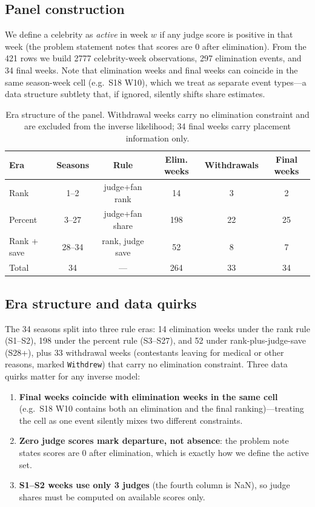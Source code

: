 \documentclass[12pt]{article}
\begin{document}
\subsection{Panel construction}
We define a celebrity as \emph{active} in week $w$ if any judge score is positive in
that week (the problem statement notes that scores are 0 after elimination). From the
421 rows we build 2777 celebrity-week observations, 297 elimination events, and 34
final weeks. Note that elimination weeks and final weeks can coincide in the same
season-week cell (e.g.\ S18 W10), which we treat as separate event types---a data
structure subtlety that, if ignored, silently shifts share estimates.

\begin{table}[h]
\centering
\begin{tabular}{lccccc}
\toprule
Era & Seasons & Rule & Elim. weeks & Withdrawals & Final weeks \\
\midrule
Rank & 1--2 & judge+fan rank & 14 & 3 & 2 \\
Percent & 3--27 & judge+fan share & 198 & 22 & 25 \\
Rank + save & 28--34 & rank, judge save & 52 & 8 & 7 \\
\midrule
Total & 34 & --- & 264 & 33 & 34 \\
\bottomrule
\end{tabular}
\caption{Era structure of the panel. Withdrawal weeks carry no elimination
constraint and are excluded from the inverse likelihood; 34 final weeks carry
placement information only.}
\label{tab:era}
\end{table}

\subsection{Era structure and data quirks}
The 34 seasons split into three rule eras: 14 elimination weeks under the rank rule
(S1--S2), 198 under the percent rule (S3--S27), and 52 under rank-plus-judge-save
(S28+), plus 33 withdrawal weeks (contestants leaving for medical or other reasons,
marked \texttt{Withdrew}) that carry no elimination constraint. Three data quirks
matter for any inverse model:
\begin{enumerate}
\item \textbf{Final weeks coincide with elimination weeks in the same cell} (e.g.\ S18 W10
contains both an elimination and the final ranking)---treating the cell as one event
silently mixes two different constraints.
\item \textbf{Zero judge scores mark departure, not absence}: the problem note states
scores are 0 after elimination, which is exactly how we define the active set.
\item \textbf{S1--S2 weeks use only 3 judges} (the fourth column is NaN), so judge
shares must be computed on available scores only.
\end{enumerate}
\end{document}
